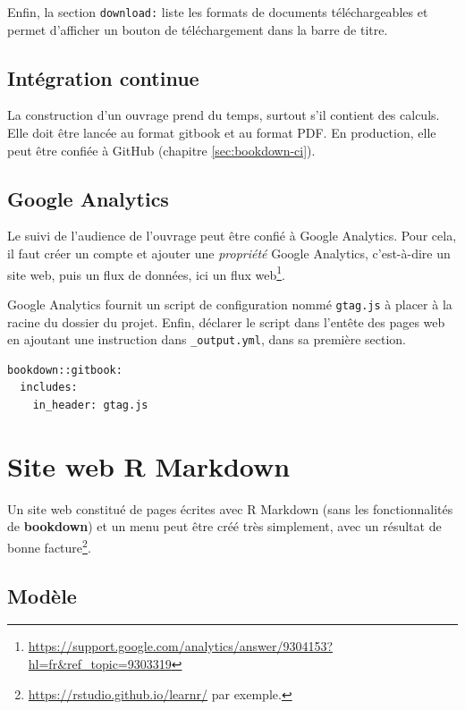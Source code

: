 \documentclass[
  12pt,
  french,
  a4paper,
  extrafontsizes,onecolumn,openright
  ]{memoir}
\begin{document}
Enfin, la section \texttt{download:} liste les formats de documents téléchargeables et permet d'afficher un bouton de téléchargement dans la barre de titre.

\hypertarget{sec:rediger-ouvrage-ci}{%
\subsection{Intégration continue}\label{sec:rediger-ouvrage-ci}}

La construction d'un ouvrage prend du temps, surtout s'il contient des calculs.
Elle doit être lancée au format gitbook et au format PDF.
En production, elle peut être confiée à GitHub (chapitre \ref{sec:bookdown-ci}).

\hypertarget{google-analytics}{%
\subsection{Google Analytics}\label{google-analytics}}

Le suivi de l'audience de l'ouvrage peut être confié à Google Analytics.
Pour cela, il faut créer un compte et ajouter une \emph{propriété} Google Analytics, c'est-à-dire un site web, puis un flux de données, ici un flux web\footnote{\url{https://support.google.com/analytics/answer/9304153?hl=fr\&ref_topic=9303319}}.

Google Analytics fournit un script de configuration nommé \texttt{gtag.js} à placer à la racine du dossier du projet.
Enfin, déclarer le script dans l'entête des pages web en ajoutant une instruction dans \texttt{\_output.yml}, dans sa première section.

\begin{verbatim}
bookdown::gitbook:
  includes:
    in_header: gtag.js
\end{verbatim}

\hypertarget{site-web-r-markdown}{%
\section{Site web R Markdown}\label{site-web-r-markdown}}

Un site web constitué de pages écrites avec R Markdown (sans les fonctionnalités de \textbf{bookdown}) et un menu peut être créé très simplement, avec un résultat de bonne facture\footnote{\url{https://rstudio.github.io/learnr/} par exemple.}.

\hypertarget{moduxe8le}{%
\subsection{Modèle}\label{moduxe8le}}
\end{document}
